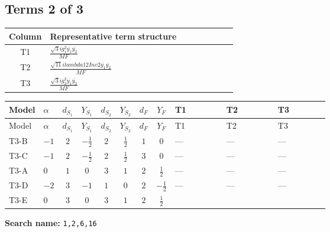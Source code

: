 \documentclass[8pt]{article}
\begin{document}
\begin{landscape}
\subsection*{Terms 2 of 3}
\begin{center}
\begin{tabular}{@{}c >{\raggedright\arraybackslash}p{0.82\linewidth}@{}}
\toprule
Column & Representative term structure \\
\midrule
T1 & \(\displaystyle \frac{\sqrt{3} i g_{1}^{2} \overline{y_{1}} \overline{y_{2}}}{MF}\) \\
\midrule
T2 & \(\displaystyle \frac{\sqrt{11} i lambda12Inv2 \overline{y_{1}} \overline{y_{2}}}{MF}\) \\
\midrule
T3 & \(\displaystyle \frac{\sqrt{3} i g_{2}^{2} \overline{y_{1}} \overline{y_{2}}}{MF}\) \\
\midrule
\bottomrule
\end{tabular}
\end{center}
\smallskip
\tiny
\begin{longtable}{@{}llcccccc >{\raggedright\arraybackslash}p{0.21\linewidth} >{\raggedright\arraybackslash}p{0.21\linewidth} >{\raggedright\arraybackslash}p{0.21\linewidth}@{}}
\toprule
Model & $\alpha$ & $d_{S_1}$ & $Y_{S_1}$ & $d_{S_2}$ & $Y_{S_2}$ & $d_F$ & $Y_F$ & T1 & T2 & T3 \\
\midrule
\endfirsthead
\toprule
Model & $\alpha$ & $d_{S_1}$ & $Y_{S_1}$ & $d_{S_2}$ & $Y_{S_2}$ & $d_F$ & $Y_F$ & T1 & T2 & T3 \\
\midrule
\endhead
T3-B & $-1$ & $2$ & $-\frac{1}{2}$ & $2$ & $\frac{1}{2}$ & $1$ & $0$ & --- & --- & --- \\
\midrule
T3-C & $-1$ & $2$ & $-\frac{1}{2}$ & $2$ & $\frac{1}{2}$ & $3$ & $0$ & --- & --- & --- \\
\midrule
T3-A & $0$ & $1$ & $0$ & $3$ & $1$ & $2$ & $\frac{1}{2}$ & --- & --- & --- \\
\midrule
T3-D & $-2$ & $3$ & $-1$ & $1$ & $0$ & $2$ & $-\frac{1}{2}$ & --- & --- & --- \\
\midrule
T3-E & $0$ & $3$ & $0$ & $3$ & $1$ & $2$ & $\frac{1}{2}$ & \scriptsize\adjustbox{max width=\linewidth}{$\begin{gathered} \frac{\sqrt{3} i g_{1}^{2} \overline{y_{1}} \overline{y_{2}}}{8 MF}\end{gathered}$} & \scriptsize\adjustbox{max width=\linewidth}{$\begin{gathered} \frac{3 \sqrt{11} i lambda12Inv2 \overline{y_{1}} \overline{y_{2}}}{22 MF}\end{gathered}$} & \scriptsize\adjustbox{max width=\linewidth}{$\begin{gathered} \frac{15 \sqrt{3} i g_{2}^{2} \overline{y_{1}} \overline{y_{2}}}{8 MF}\end{gathered}$} \\
\midrule
\bottomrule
\end{longtable}
\clearpage
\noindent\textbf{Search name: }\texttt{1,2,6,16}\par\smallskip

\end{landscape}
\end{document}
